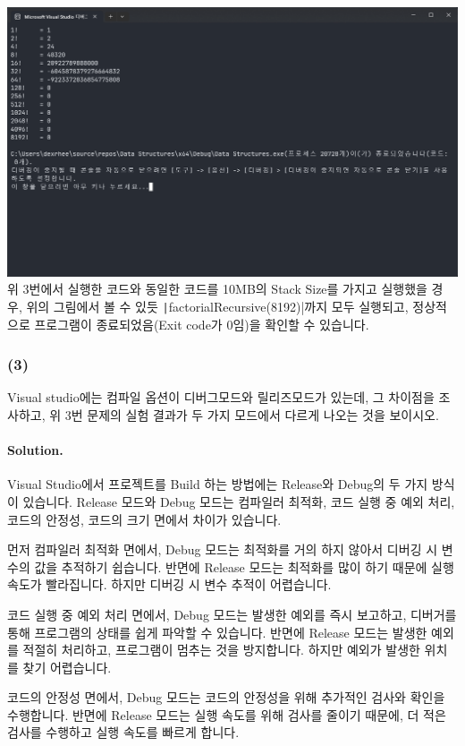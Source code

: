 \includegraphics[width=\textwidth]{./img/5-3.png}
위 3번에서 실행한 코드와 동일한 코드를 10MB의 Stack Size를 가지고 실행했을 경우,
위의 그림에서 볼 수 있듯 \texttt|factorialRecursive(8192)|까지 모두 실행되고,
정상적으로 프로그램이 종료되었음(Exit code가 0임)을 확인할 수 있습니다.

\subsubsection{(3)}
Visual studio에는 컴파일 옵션이 디버그모드와 릴리즈모드가 있는데,
그 차이점을 조사하고, 위 3번 문제의 실험 결과가 두 가지 모드에서 다르게 나오는 것을 보이시오.

\paragraph{Solution.} Visual Studio에서 프로젝트를 Build 하는 방법에는 Release와 Debug의 두 가지 방식이 있습니다.
Release 모드와 Debug 모드는 컴파일러 최적화, 코드 실행 중 예외 처리, 코드의 안정성, 코드의 크기 면에서 차이가 있습니다.

먼저 컴파일러 최적화 면에서,
Debug 모드는 최적화를 거의 하지 않아서 디버깅 시 변수의 값을 추적하기 쉽습니다.
반면에 Release 모드는 최적화를 많이 하기 때문에 실행 속도가 빨라집니다. 하지만 디버깅 시 변수 추적이 어렵습니다.

코드 실행 중 예외 처리 면에서,
Debug 모드는 발생한 예외를 즉시 보고하고, 디버거를 통해 프로그램의 상태를 쉽게 파악할 수 있습니다.
반면에 Release 모드는 발생한 예외를 적절히 처리하고, 프로그램이 멈추는 것을 방지합니다. 하지만 예외가 발생한 위치를 찾기 어렵습니다.

코드의 안정성 면에서,
Debug 모드는 코드의 안정성을 위해 추가적인 검사와 확인을 수행합니다.
반면에 Release 모드는 실행 속도를 위해 검사를 줄이기 때문에, 더 적은 검사를 수행하고 실행 속도를 빠르게 합니다.

